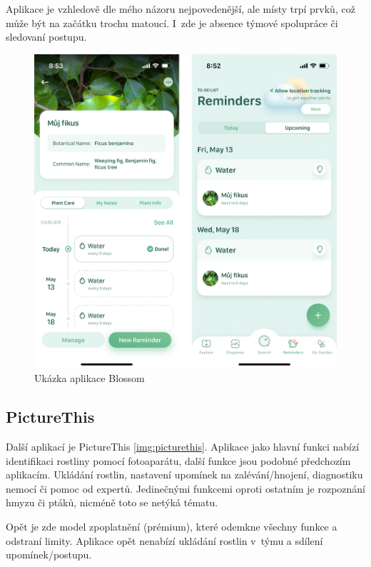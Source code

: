 \documentclass[thesis=M,czech]{FITthesis}[2019/12/23]
\begin{document}
    Aplikace je vzhledově dle mého názoru nejpovedenější, ale místy trpí  prvků, což může být na začátku trochu matoucí. I~zde je absence týmové spolupráce či sledovaní postupu.
    
    \begin{figure}
    	\centering
    	\includegraphics[width=0.75\linewidth]{images/blossom.png}
      	\caption{Ukázka aplikace Blossom}
      	\label{img:blossom}
    \end{figure}
    
\subsection{PictureThis}
    Další aplikací je PictureThis \ref{img:picturethis}. Aplikace jako hlavní funkci nabízí identifikaci rostliny pomocí fotoaparátu, další funkce jsou podobné předchozím aplikacím. Ukládání rostlin, nastavení upomínek na zalévání/hnojení, diagnostiku nemocí či pomoc od expertů. Jedinečnými funkcemi oproti ostatním je rozpoznání hmyzu či ptáků, nicméně toto se netýká tématu.
    
    Opět je zde model zpoplatnění (prémium), které odemkne všechny funkce a odstraní limity. Aplikace opět nenabízí ukládání rostlin v~týmu a sdílení upomínek/postupu.
    
\end{document}
